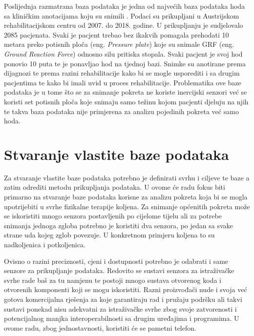 \documentclass[times, utf8, diplomski]{fer}
\begin{document}
Poslijednja razmatrana baza podataka je jedna od najvećih baza podataka hoda sa kliničkim anotacijama koju su snimili \cite{pressurePlate}.
Podaci su prikupljani u Austrijskom rehabilitacijskom centru od 2007. do 2018. godine. U prikupljanju je sudjelovalo 2085 pacjenata.
Svaki je pacjent trebao bez ikakvih pomagala prehodati 10 metara preko potisnih ploča (eng. \textit{Pressure plate}) koje su snimale
GRF (eng. \textit{Ground Reaction Force}) odnosno silu pritiska stopala. Svaki pacjent je svoj hod ponovio 10 puta te je ponavljao
hod na tjednoj bazi. Snimke su anotirane prema dijagnozi te prema razini rehabilitacije kako bi se mogle usporediti i sa drugim
pacjentima te kako bi imali uvid u proces rehabilitacije. Problematika ove baze podataka je u tome što se za snimanje pokreta ne
koriste inercijski senzori već se koristi set potisnih ploča koje snimaju samo težinu kojom pacjenti djeluju na njih te takva baza 
podataka nije primjerena za analizu pojedinih pokreta već samo hoda.



\section{Stvaranje vlastite baze podataka}
Za stvaranje vlastite baze podataka potrebno je definirati svrhu i ciljeve te baze a zatim odrediti metodu prikupljanja podataka. U ovome će radu
fokus biti primarno na stvaranje baze podataka korisne za analizu pokreta koja bi se mogla upotrijebiti u svrhe fizikalne terapije koljena.
Za snimanje općenitih pokreta može se iskoristiti mnogo senzora postavljenih po cijelome tijelu ali za potrebe snimanja jednoga zgloba potrebno je 
koristiti dva senzora, po jedan sa svake strane uda kojeg zglob povezuje. U konkretnom primjeru koljena to su nadkoljenica i potkoljenica.

Ovisno o razini preciznosti, cjeni i dostupnosti potrebno je odabrati i same senzore za prikupljanje podataka. Redovito se sustavi senzora
za istraživačke svrhe rade baš za tu namjenu te postoji mnogo sustava otvorenog koda i otvorenih komponenti koji se mogu iskoristiti. Razni
proizvođači nude i svoja već gotova komercijalna rješenja za koje garantiraju rad i pružaju podršku ali takvi sustavi ponekad nisu adekvatni za
istraživačke svrhe zbog svoje zatvorenosti i potencijalnog manjka interoperabilnosti sa drugim uređajima i programima. U ovome radu, zbog jednostavnosti,
koristiti će se pametni telefon.
\end{document}
